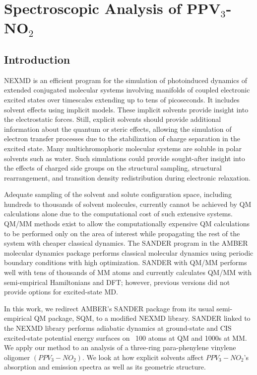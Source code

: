 \chapter{Spectroscopic Analysis of PPV\(_3\)-NO\(_2\)}

\section{Introduction}
NEXMD is an efficient program for the simulation of photoinduced
dynamics of extended conjugated molecular systems involving manifolds
of coupled electronic excited states over timescales extending up to
tens of picoseconds. \cite{sifain2018photoexcited, Bjorgaard2015,
  case2020a, tretiak02_densit_matrix_analy_simul_elect,
  malone2020nexmd} It includes solvent effects using implicit
models. These implicit solvents provide insight into the electrostatic
forces. Still, explicit solvents should provide additional information
about the quantum or steric effects, allowing the simulation of
electron transfer processes due to the stabilization of charge
separation in the excited state.\cite{woo2005solvent}  Many multichromophoric molecular
systems are soluble in polar solvents such as water. Such simulations
could provide sought-after insight into the effects of charged side
groups on the structural sampling, structural rearrangement, and
transition density redistribution during electronic relaxation.

Adequate sampling of the solvent and solute configuration space,
including hundreds to thousands of solvent molecules, currently
cannot be achieved by QM calculations alone due to the 
computational cost of such extensive
systems. \cite{barbatti2011nonadiabatic} QM/MM methods exist to allow
the computationally expensive QM calculations to be performed only on
the area of interest while propagating the rest of the system with
cheaper classical dynamics.  The SANDER program in the AMBER
molecular dynamics package performs classical molecular dynamics
using periodic boundary conditions with high optimization.  SANDER
with QM/MM performs well with tens of thousands of MM atoms and
currently calculates QM/MM with semi-empirical Hamiltonians and DFT;
however, previous versions did not provide options for excited-state
MD.

In this work, we redirect AMBER's SANDER package from its usual
semi-empirical QM package, SQM, to a modified NEXMD library.
SANDER linked to the NEXMD library performs adiabatic dynamics at
ground-state and CIS excited-state potential energy surfaces on
~100 atoms at QM and 1000s at MM.  We apply our method to an
analysis of a three-ring para-phenylene vinylene oligomer
\((PPV_{3}-NO_{2})\).  We look at how explicit solvents affect \(PPV_{3}-NO_{2}\)'s
absorption and emission spectra as well as its geometric structure.

